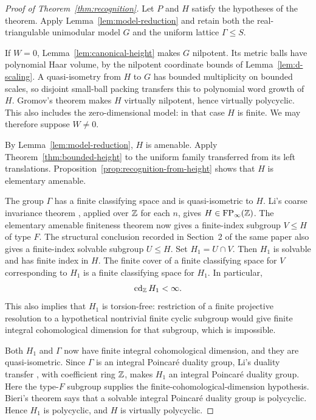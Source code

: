 \begin{proof}[Proof of Theorem~\ref{thm:recognition}]
Let $P$ and $H$ satisfy the hypotheses of the theorem.  Apply
Lemma~\ref{lem:model-reduction} and retain both the real-triangulable
unimodular model $G$ and the uniform lattice $\Gamma\leq S$.

If $W=0$, Lemma~\ref{lem:canonical-height} makes $G$ nilpotent.  Its metric
balls have polynomial Haar volume, by the nilpotent coordinate bounds
of Lemma~\ref{lem:d-scaling}.  A quasi-isometry from $H$ to $G$ has
bounded multiplicity on bounded scales, so disjoint small-ball packing
transfers this to polynomial word growth of $H$.  Gromov's theorem
\cite[Main Theorem, p.~54]{Gromov1981} makes $H$ virtually nilpotent,
hence virtually polycyclic.  This also includes the zero-dimensional
model: in that case $H$ is finite.  We may therefore suppose $W\ne0$.

By Lemma~\ref{lem:model-reduction}, $H$ is amenable.  Apply
Theorem~\ref{thm:bounded-height} to the uniform family transferred
from its left translations.  Proposition~\ref{prop:recognition-from-height}
shows that $H$ is elementary amenable.

The group $\Gamma$ has a finite classifying space and is quasi-isometric
to $H$.  Li's coarse invariance theorem
\cite[Corollary~4.47]{Li2018}, applied over $\mathbb Z$ for each $n$, gives
$H\in\mathrm{FP}_\infty(\mathbb Z)$.  The elementary amenable finiteness theorem
\cite[Theorem~1.1, (viii)$\Rightarrow$(v)]{KrophollerMartinezPerezNucinkis2009}
now gives a finite-index subgroup $V\leq H$ of type $F$.  The structural
conclusion recorded in Section~2 of the same paper also gives a
finite-index solvable subgroup $U\leq H$.  Set $H_1=U\cap V$.
Then $H_1$ is solvable and has finite index in $H$.  The finite cover of
a finite classifying space for $V$ corresponding to $H_1$ is a finite
classifying space for $H_1$.  In particular,
\[
 \operatorname{cd}_{\mathbb Z}H_1<\infty.
\]
This also implies that $H_1$ is torsion-free: restriction of a finite
projective resolution to a hypothetical nontrivial finite cyclic
subgroup would give finite integral cohomological dimension for that
subgroup, which is impossible.

Both $H_1$ and $\Gamma$ now have finite integral cohomological dimension,
and they are quasi-isometric.  Since $\Gamma$ is an integral
Poincar\'e duality group, Li's duality transfer
\cite[Corollary~4.48]{Li2018}, with coefficient ring $\mathbb Z$, makes $H_1$
an integral Poincar\'e duality group.  Here the type-$F$ subgroup supplies
the finite-cohomological-dimension hypothesis.  Bieri's theorem
\cite[Theorem~9.23]{Bieri1981} says that a solvable integral
Poincar\'e duality group is polycyclic.  Hence $H_1$ is polycyclic, and
$H$ is virtually polycyclic.
\end{proof}

